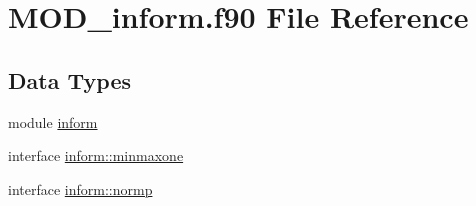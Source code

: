 \hypertarget{MOD__inform_8f90}{\section{M\-O\-D\-\_\-inform.\-f90 File Reference}
\label{MOD__inform_8f90}
}
\subsection*{Data Types}
\begin{DoxyCompactItemize}
\item 
module \hyperlink{classinform}{inform}
\item 
interface \hyperlink{interfaceinform_1_1minmaxone}{inform\-::minmaxone}
\item 
interface \hyperlink{interfaceinform_1_1normp}{inform\-::normp}
\end{DoxyCompactItemize}
